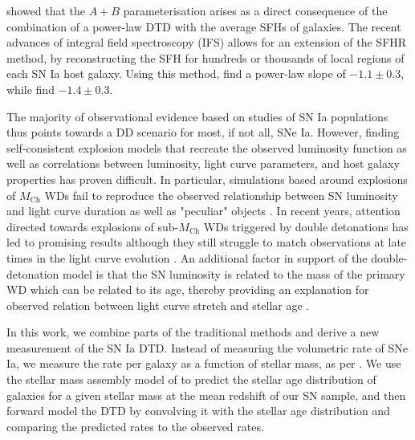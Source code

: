 \documentclass[fleqn,usenatbib]{mnras}
\begin{document}
\citet{Childress2014} showed that the $A+B$ parameterisation arises as a direct consequence of the combination of a power-law DTD with the average SFHs of galaxies. The recent advances of integral field spectroscopy (IFS) allows for an extension of the SFHR method, by reconstructing the SFH for hundreds or thousands of local regions of each SN Ia host galaxy. Using this method, \citet{Castrillo2020} find a power-law slope of $-1.1\pm0.3$, while \citet{Chen2021} find $-1.4\pm0.3$.

The majority of observational evidence based on studies of SN Ia populations thus points towards a DD scenario for most, if not all, SNe Ia. However, finding self-consistent explosion models that recreate the observed luminosity function as well as correlations between luminosity, light curve parameters, and host galaxy properties has proven difficult. In particular, simulations based around explosions of $M_{\mathrm{Ch}}$ WDs fail to reproduce the observed relationship between SN luminosity and light curve duration as well as "peculiar" objects \citep{Sim2013,Blondin2017}. In recent years, attention directed towards explosions of sub-$M_{\mathrm{Ch}}$ WDs triggered by double detonations has led to promising results \citep[e.g.][]{Shen2017,Shen2018,Townsley2019,Gronow2020,Shen2021} although they still struggle to match observations at late times in the light curve evolution \citep{Shen2021,Gronow2021}. An additional factor in support of the double-detonation model is that the SN luminosity is related to the mass of the primary WD which can be related to its age, thereby providing an explanation for observed relation between light curve stretch and stellar age \citep{Rigault2013,Rigault2018,Nicolas2020}.



In this work, we combine parts of the traditional methods and derive a new measurement of the SN Ia DTD. Instead of measuring the volumetric rate of SNe Ia, we measure the rate per galaxy as a function of stellar mass, as per \citet{Sullivan2006,Smith2012}. We use the stellar mass assembly model of \citet{Childress2014} to predict the stellar age distribution of galaxies for a given stellar mass at the mean redshift of our SN sample, and then forward model the DTD by convolving it with the stellar age distribution and comparing the predicted rates to the observed rates.
\end{document}
